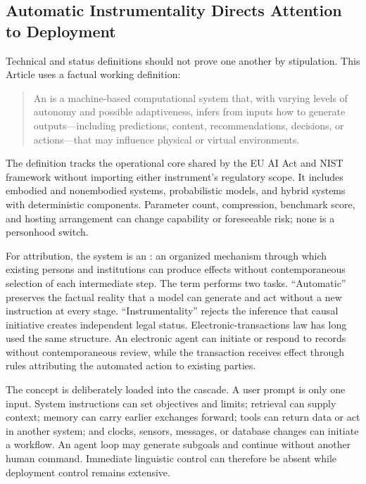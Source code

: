 \subsection{Automatic Instrumentality Directs Attention to Deployment}

Technical and status definitions should not prove one another by stipulation. This Article uses a factual working definition:

\begin{quote}
An  is a machine-based computational system that, with varying levels of autonomy and possible adaptiveness, infers from inputs how to generate outputs---including predictions, content, recommendations, decisions, or actions---that may influence physical or virtual environments.
\end{quote}

The definition tracks the operational core shared by the EU AI Act and NIST framework without importing either instrument's regulatory scope. It includes embodied and nonembodied systems, probabilistic models, and hybrid systems with deterministic components. Parameter count, compression, benchmark score, and hosting arrangement can change capability or foreseeable risk; none is a personhood switch.

For attribution, the system is an : an organized mechanism through which existing persons and institutions can produce effects without contemporaneous selection of each intermediate step. The term performs two tasks. ``Automatic'' preserves the factual reality that a model can generate and act without a new instruction at every stage. ``Instrumentality'' rejects the inference that causal initiative creates independent legal status. Electronic-transactions law has long used the same structure. An electronic agent can initiate or respond to records without contemporaneous review, while the transaction receives effect through rules attributing the automated action to existing parties.

The concept is deliberately loaded into the cascade. A user prompt is only one input. System instructions can set objectives and limits; retrieval can supply context; memory can carry earlier exchanges forward; tools can return data or act in another system; and clocks, sensors, messages, or database changes can initiate a workflow. An agent loop may generate subgoals and continue without another human command. Immediate linguistic control can therefore be absent while deployment control remains extensive.

